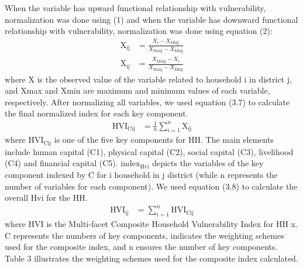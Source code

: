 When the variable has upward functional relationship with vulnerability, normalization was done using (1) and when the variable has downward functional relationship with vulnerability, normalization was done using equation (2):
\begin{align}
	\text{X}_{\text{ij}} &= \frac{X_{\text{i}} - X_{\text{Minj}}}{X_{\text{Maxj}} - X_{\text{Minj}}} \tag{1} \\[1cm] 	
	\text{X}_{\text{ij}} &= \frac{X_{\text{Maxj}} - X_{\text{i}}}{X_{\text{Maxj}} - X_{\text{Minj}}} \tag{2}
\end{align} 
where X is the observed value of the variable related to household i in district j, and Xmax and Xmin are 
maximum and minimum values of each variable, respectively. After normalizing all variables, 
we used equation (3.7) to calculate the final normalized index for each key component.
\begin{align}
	\text{HVI}_{\text{Cij}} &= \frac{1}{n}\sum_{i=1}^{n}\text{X}_{\text{ij}} \tag{3}
\end{align}
where $\text{HVI}_{\text{Cij}}$ is one of the five key components for HH. The main elements include human capital (C1), physical capital (C2), social capital (C3), livelihood (C4) and financial capital (C5). 	$\text{index}_{\text{Hvi}}$
depicts the variables of the key component indexed by C for i household in j district (while n represents the number of variables for each component). We used equation (3.8) to 
calculate the overall Hvi for the HH.
\begin{align}
	\text{HVI}_{\text{ij}} &= \sum_{i=1}^{n}\text{HVI}_{\text{Cij}} \tag{4}
\end{align}
where HVI is the Multi-facet Composite Household Vulnerability Index for HH x. 
C represents the numbers of key components,  indicates the weighting schemes used for the 
composite index, and n ensures the number of key components. Table 3 illustrates the weighting 
schemes used for the composite index calculated.\par 
                                   
